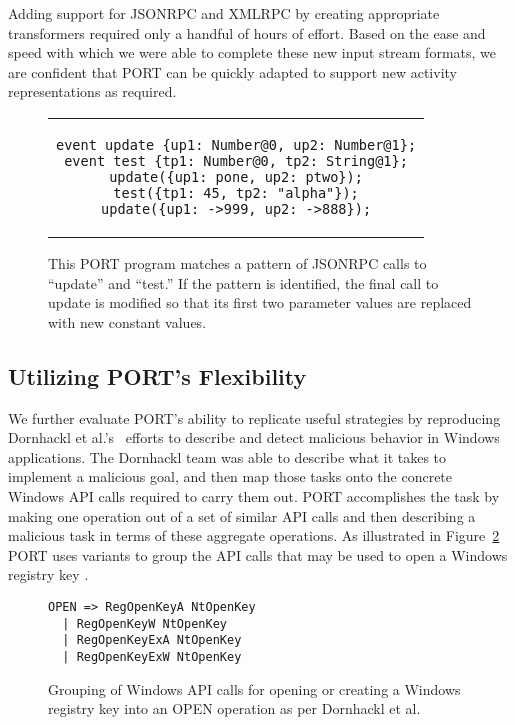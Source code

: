 Adding support for JSONRPC and XMLRPC by creating
appropriate transformers required only a handful of hours of effort.
Based on the ease and speed with which we
were able to complete these new input stream formats, we are confident that PORT can be
quickly adapted to support new activity representations as required.

\begin{figure}[t]
\centering
\begin{tabular}{c}
\begin{lstlisting}
event update {up1: Number@0, up2: Number@1};
event test {tp1: Number@0, tp2: String@1};
update({up1: pone, up2: ptwo});
test({tp1: 45, tp2: "alpha"});
update({up1: ->999, up2: ->888});
\end{lstlisting}
\end{tabular}
\caption{This PORT program matches a pattern of JSONRPC calls to
  ``update'' and ``test.''  If the pattern is identified, the final call to
  update is modified so that its first two parameter values are replaced
  with new constant values.}
\label{lst:JSONProgram}
\end{figure}


\subsection{Utilizing PORT's Flexibility}
We further evaluate PORT's ability to replicate useful strategies by
reproducing Dornhackl et al.'s~\cite{Dornhackl2014}
efforts to describe and detect malicious behavior in Windows
applications.  The Dornhackl team was able to describe what it takes to implement a malicious goal, and then
map those tasks onto the
concrete Windows API calls required to carry them out. PORT accomplishes the task by making one operation out of a set of similar API calls and then describing a malicious task  in terms of
these aggregate operations. As illustrated in  Figure~\ref{lst:DornhacklOpen} PORT uses variants to group the API calls that may be used to
open a Windows registry key \cite{Dornhackl2014}. 

\begin{figure}[t]
\begin{lstlisting}
OPEN => RegOpenKeyA NtOpenKey
  | RegOpenKeyW NtOpenKey
  | RegOpenKeyExA NtOpenKey
  | RegOpenKeyExW NtOpenKey
\end{lstlisting}
\caption{Grouping of Windows API calls for opening or creating a Windows
  registry key into an OPEN operation as per Dornhackl et al.}
\label{lst:DornhacklOpen}
\end{figure}

